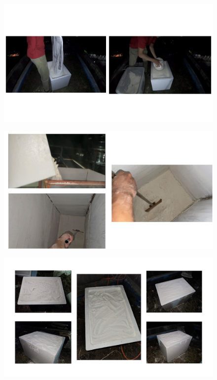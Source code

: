 \begin{figure}[H]
	\centering
	\includegraphics[width=1\textwidth]{Figures/Appendecis/testing/Slide8}
\end{figure}
\begin{figure}[H]
	\centering
	\includegraphics[width=1\textwidth]{Figures/Appendecis/testing/Slide9}
\end{figure}
\begin{figure}[H]
	\centering
	\includegraphics[width=1\textwidth]{Figures/Appendecis/testing/Slide10}
\end{figure}

